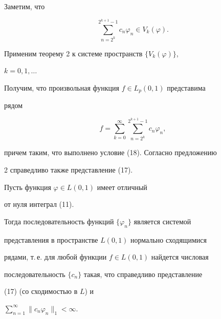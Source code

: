  


\begin{pf} Заметим, что 


$$ 


\sum^{2^{k+1}-1}_{n=2^k}c_n\varphi_n\in V_k(\varphi). 


$$ 


Применим теорему 2 к системе пространств $\{V_k(\varphi)\}$, 


$k=0,1,\dotsc$ 


Получим, что произвольная функция $f\in L_p(0,1)$ представима 


рядом 


$$ 


f=\sum^\infty_{k=0} 


\sum^{2^{k+1}-1}_{n=2^k}c_n\varphi_n, 


$$ 


причем таким, что выполнено условие (18). Согласно предложению 


2 справедливо также представление (17). 


\end{pf} 


 


\begin{cor} Пусть функция $\varphi\in L(0,1)$ имеет отличный 


от нуля интеграл (11). 


Тогда последовательность функций $\{\varphi_n\}$ является системой 


представления в пространстве $L(0,1)$ нормально сходящимися 


рядами, т.\,е. для любой функции $f\in L(0,1)$ найдется числовая  


последовательность $\{c_n\}$ такая, что справедливо представление  


(17) (со сходимостью в $L$) и 


$\sum\limits^\infty_{n=1}\|c_n\varphi_n\|_1<\infty$. 


\end{cor} 


 


